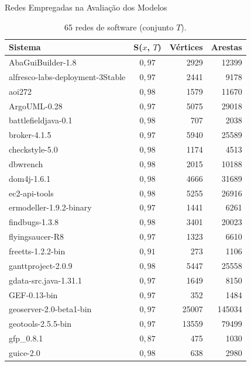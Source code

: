 \begin{chapter}{Redes Empregadas na Avaliação dos Modelos} \label{cap:lista-redes}
%

\begin{center}
\begin{longtable}{| p{10cm} | c | r | r |}
	\caption{65 redes de software (conjunto $T$).}	\\
	\hline
	\textbf{Sistema} & \textbf{S($x$, $T$)} & \textbf{Vértices} & \textbf{Arestas} \\ \hline
	\hline
	AbaGuiBuilder-1.8 &  $0,97$ & 2929 & 12399 \\ \hline
	alfresco-labs-deployment-3Stable &  $0,97$ & 2441 & 9178 \\ \hline
	aoi272 &  $0,98$ & 1579 & 11670 \\ \hline
	ArgoUML-0.28 &  $0,97$ & 5075 & 29018 \\ \hline
	battlefieldjava-0.1 &  $0,98$ & 707 & 2038 \\ \hline
	broker-4.1.5 &  $0,97$ & 5940 & 25589 \\ \hline
	checkstyle-5.0 &  $0,98$ & 1174 & 4513 \\ \hline
	dbwrench &  $0,98$ & 2015 & 10188 \\ \hline
	dom4j-1.6.1 &  $0,98$ & 4666 & 31689 \\ \hline
	ec2-api-tools &  $0,98$ & 5255 & 26916 \\ \hline
	ermodeller-1.9.2-binary &  $0,97$ & 1441 & 6261 \\ \hline
	findbugs-1.3.8 &  $0,98$ & 3401 & 20023 \\ \hline
	flyingsaucer-R8 &  $0,97$ & 1323 & 6610 \\ \hline
	freetts-1.2.2-bin &  $0,91$ & 273 & 1106 \\ \hline
	ganttproject-2.0.9 &  $0,98$ & 5447 & 25558 \\ \hline
	gdata-src.java-1.31.1 &  $0,97$ & 1649 & 8150 \\ \hline
	GEF-0.13-bin &  $0,97$ & 352 & 1484 \\ \hline
	geoserver-2.0-beta1-bin &  $0,97$ & 25007 & 145034 \\ \hline
	geotools-2.5.5-bin &  $0,97$ & 13559 & 79499 \\ \hline
	gfp\_0.8.1 &  $0,87$ & 475 & 1030 \\ \hline
	guice-2.0 &  $0,98$ & 638 & 2980 \\ \hline

\end{longtable}
\end{center}
\end{chapter}
